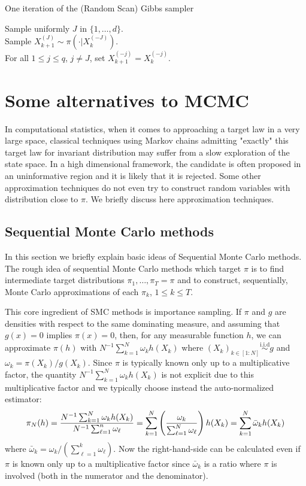 \documentclass[english,graybox,envcountchap,envcountsame,sectrefs,shortlabels]{svmono}
\theoremstyle{style}
\newcommand{\iid}{\stackrel{\mathrm{i.i.d}}{\sim}}
\begin{document}
\begin{algorithm}
\caption{One iteration of the (Random Scan) Gibbs sampler}
{}
\BlankLine
Sample uniformly $J$ in $\{1,\ldots,d\}$.\\
Sample $X_{k+1}^{(J)} \sim \pi(\cdot |X_k^{(-J)})$.\\
For all $1\leq j\leq q$, $j\neq J$, set $X_{k+1}^{(-j)}=X_k^{(-j)}$.
\end{algorithm}


\section{Some alternatives to MCMC}
In computational statistics, when it comes to approaching a target law in a very large space,
classical techniques using Markov chains admitting "exactly" this target law
for invariant distribution may suffer from a slow exploration of the state space. In a high dimensional framework, the candidate is often proposed in an uninformative region and it is likely that it is rejected. Some other approximation techniques do not even try to construct random variables with distribution close to $\pi$. We briefly discuss here approximation techniques.

\subsection{Sequential Monte Carlo methods}
In this section we briefly explain basic ideas of Sequential Monte Carlo methods.
The rough idea of sequential Monte Carlo methods which target $\pi$ is to find intermediate target distributions $\pi_1, \ldots , \pi_T=\pi$ and to construct, sequentially, Monte Carlo approximations of each $\pi_k$, $1\leq k \leq T$.




This core ingredient of SMC methods is importance sampling. If $\pi$ and $g$ are densities with respect to  the same dominating measure, and assuming that $g(x)=0$ implies $\pi(x)=0$, then, for any measurable function $h$, we can approximate $\pi(h)$ with $N^{-1}\sum_{k=1}^N \omega_k h(X_k)$ where $(X_k)_{k\in[1:N]} \iid g$ and $\omega_k=\pi(X_k)/g(X_k)$. Since $\pi$ is typically known only up to a multiplicative factor, the quantity $N^{-1}\sum_{k=1}^N \omega_k h(X_k)$ is not explicit due to this multiplicative factor and we typically choose instead the auto-normalized estimator:
$$
\pi_N(h) = \frac{N^{-1}\sum_{k=1}^N \omega_k h(X_k)}{N^{-1}\sum_{\ell=1}^n \omega_\ell}=\sum_{k=1}^N \left(\frac{ \omega_k}{\sum_{\ell=1}^N \omega_\ell}\right)  h(X_k)=\sum_{k=1}^N \bar\omega_k  h(X_k)
$$
where  $\bar \omega_k=\omega_k/(\sum_{\ell=1}^{k} \omega_\ell)$. Now the right-hand-side can be calculated even if $\pi$ is known only up to a multiplicative factor since $\bar \omega_k$ is a ratio where $\pi$ is involved (both in the numerator and the denominator).
\end{document}
